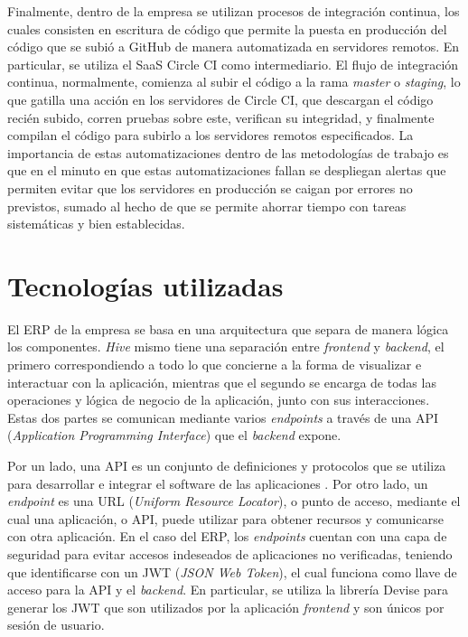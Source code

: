    Finalmente, dentro de la empresa se utilizan procesos de integración continua, los cuales consisten en escritura de código que permite la puesta en producción del código que se subió a GitHub de manera automatizada en servidores remotos. En particular, se utiliza el SaaS Circle CI como intermediario. El flujo de integración continua, normalmente, comienza al subir el código a la rama \textit{master} o \textit{staging}, lo que gatilla una acción en los servidores de Circle CI, que descargan el código recién subido, corren pruebas sobre este, verifican su integridad, y finalmente compilan el código para subirlo a los servidores remotos especificados. La importancia de estas automatizaciones dentro de las metodologías de trabajo es que en el minuto en que estas automatizaciones fallan se despliegan alertas que permiten evitar que los servidores en producción se caigan por errores no previstos, sumado al hecho de que se permite ahorrar tiempo con tareas sistemáticas y bien establecidas.
    

\section{Tecnologías utilizadas}

    El ERP de la empresa se basa en una arquitectura que separa de manera lógica los componentes. \textit{Hive} mismo tiene una separación entre \textit{frontend} y \textit{backend}, el primero correspondiendo a todo lo que concierne a la forma de visualizar e interactuar con la aplicación, mientras que el segundo se encarga de todas las operaciones y lógica de negocio de la aplicación, junto con sus interacciones. Estas dos partes se comunican mediante varios \textit{endpoints} a través de una API (\textit{Application Programming Interface}) que el \textit{backend} expone. 
    
    Por un lado, una API es un conjunto de definiciones y protocolos que se utiliza para desarrollar e integrar el software de las aplicaciones \cite{redhat_api}. Por otro lado, un \textit{endpoint} es una URL (\textit{Uniform Resource Locator}), o punto de acceso, mediante el cual una aplicación, o API, puede utilizar para obtener recursos y comunicarse con otra aplicación. En el caso del ERP, los \textit{endpoints} cuentan con una capa de seguridad para evitar accesos indeseados de aplicaciones no verificadas, teniendo que identificarse con un JWT (\textit{JSON Web Token}), el cual funciona como llave de acceso para la API y el \textit{backend}. En particular, se utiliza la librería Devise para generar los JWT que son utilizados por la aplicación \textit{frontend} y son únicos por sesión de usuario.
    
